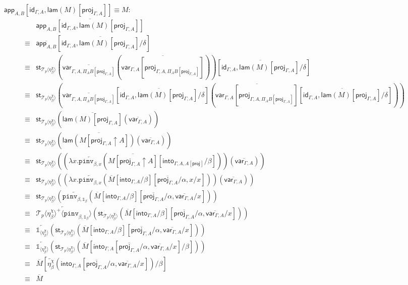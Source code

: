 \documentclass[10pt]{article}
\theoremstyle{definition}
\newcommand{\id}{\mathsf{id}}
\newcommand{\rewrite}[2]{\overleftarrow{#1}(#2)}
\newcommand\UI[2]{\ensuremath{\lambda #1.#2}}
\newcommand\StI[2]{\ensuremath{\mathsf{st}_{#1}(#2)}}
\newcommand\ApEl[2]{\mathcal{T}_{#1}\langle#2\rangle}
\newcommand\ApPlus[2]{\ensuremath{{#1}^+ \langle #2 \rangle }}
\newcommand{\upstairs}[1]{\overline{#1}}
\newcommand\proj[1]{\ensuremath{\mathsf{proj}_{#1}}}
\newcommand\qvar[1]{\ensuremath{\mathsf{var}_{#1}}}
\newcommand\into[1]{\ensuremath{\mathsf{into}_{#1}}}
\newcommand\One{\ensuremath{\mathds{1}}}
\newcommand\ApOne[1]{\ensuremath{\One_{\langle {#1} \rangle }}}
\newcommand\pinv[1]{\ensuremath{\mathtt{pinv}_{#1}}}
\newcommand\qapp[1]{\ensuremath{\mathsf{app}_{#1}}}
\newcommand\qlam{\ensuremath{\mathsf{lam}}}
\begin{document}
\begin{enumerate}[style = multiline, labelwidth = 80pt]
\item[{$\qapp{A,B}[\id_{\Gamma, A}, \qlam(M)[\proj{\Gamma, A}]] \equiv M$}:] 
\begin{align*}
&\upstairs{\qapp{A,B}[\id_{\Gamma, A}, \qlam(M)[\proj{\Gamma, A}]]} \\
\equiv{} &\upstairs{\qapp{A,B}}[\upstairs{\id_{\Gamma, A}, \qlam(M)[\proj{\Gamma, A}]}/\delta] \\
\equiv{} &\StI{\ApEl{p}{\eta^\chi_\beta}}{\upstairs{\qvar{\Gamma, A, \Pi_A B[\proj{\Gamma, A}]}}(\upstairs{\qvar{\Gamma, A}[\proj{\Gamma, A, \Pi_A B[\proj{\Gamma, A}]}]})}[\upstairs{\id_{\Gamma, A}, \qlam(M)[\proj{\Gamma, A}]}/\delta] \\
\equiv{} &\StI{\ApEl{p}{\eta^\chi_\beta}}{\upstairs{\qvar{\Gamma, A, \Pi_A B[\proj{\Gamma, A}]}}[\upstairs{\id_{\Gamma, A}, \qlam(M)[\proj{\Gamma, A}]}/\delta](\upstairs{\qvar{\Gamma, A}[\proj{\Gamma, A, \Pi_A B[\proj{\Gamma, A}]}]}[\upstairs{\id_{\Gamma, A}, \qlam(M)[\proj{\Gamma, A}]}/\delta])} \\
\equiv{} &\StI{\ApEl{p}{\eta^\chi_\beta}}{\upstairs{\qlam(M)[\proj{\Gamma, A}]}(\upstairs{\qvar{\Gamma, A}})} \\
\equiv{} &\StI{\ApEl{p}{\eta^\chi_\beta}}{\upstairs{\qlam(M[\proj{\Gamma, A} \uparrow A])}(\upstairs{\qvar{\Gamma, A}})} \\
\equiv{} &\StI{\ApEl{p}{\eta^\chi_\beta}}{(\UI{x}{\rewrite{\pinv{\beta,x}}{\upstairs{M[\proj{\Gamma, A} \uparrow A]}[\into{\Gamma, A, A[\proj{}]}/\beta]}})(\upstairs{\qvar{\Gamma, A}})} \\
\equiv{} &\StI{\ApEl{p}{\eta^\chi_\beta}}{(\UI{x}{\rewrite{\pinv{\beta,x}}{\upstairs{M}[\into{\Gamma, A}/\beta][\upstairs{\proj{\Gamma, A}}/\alpha, x/x]}})(\upstairs{\qvar{\Gamma, A}})} \\
\equiv{} &\StI{\ApEl{p}{\eta^\chi_\beta}}{\rewrite{\pinv{\beta,\One_\beta}}{\upstairs{M}[\into{\Gamma, A}/\beta][\upstairs{\proj{\Gamma, A}}/\alpha, \upstairs{\qvar{\Gamma, A}}/x]}} \\
\equiv{} &\rewrite{\ApPlus{\ApEl{p}{\eta^\chi_\beta}}{\pinv{\beta,\One_\beta}}}{\StI{\ApEl{p}{\eta^\chi_\beta}}{\upstairs{M}[\into{\Gamma, A}/\beta][\upstairs{\proj{\Gamma, A}}/\alpha, \upstairs{\qvar{\Gamma, A}}/x]}} \\
\equiv{} &\rewrite{\ApOne{\eta^\chi_\beta}}{\StI{\ApEl{p}{\eta^\chi_\beta}}{\upstairs{M}[\into{\Gamma, A}/\beta][\upstairs{\proj{\Gamma, A}}/\alpha, \upstairs{\qvar{\Gamma, A}}/x]}} \\
\equiv{} &\rewrite{\ApOne{\eta^\chi_\beta}}{\StI{\ApEl{p}{\eta^\chi_\beta}}{\upstairs{M}[\into{\Gamma, A}[\upstairs{\proj{\Gamma, A}}/\alpha, \upstairs{\qvar{\Gamma, A}}/x]/\beta]}} \\
\equiv{} &\upstairs{M}[\rewrite{\eta^\chi_\beta}{\into{\Gamma, A}[\upstairs{\proj{\Gamma, A}}/\alpha, \upstairs{\qvar{\Gamma, A}}/x]}/\beta] \\
\equiv{} &\upstairs{M}
\end{align*} 


\end{enumerate}
\end{document}
